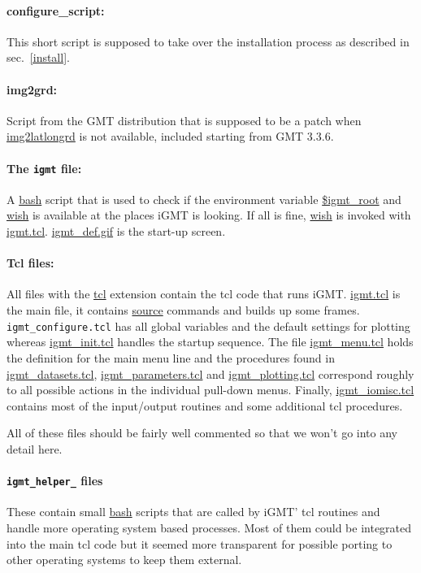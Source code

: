 \documentclass[11pt]{article}
\begin{document}
\paragraph{configure\_script:} This short script is supposed to take over the 
installation process as described in sec.~\ref{install}.

\paragraph{img2grd:} Script from the GMT distribution that is supposed to be a patch when 
\url{img2latlongrd} is not available, included starting from GMT
3.3.6.

\paragraph{The {\tt igmt} file:} A \url{bash} script that is used to
check if the environment variable \url{$igmt_root} and \url{wish} is
available at the places iGMT is looking. If all is fine, \url{wish}
is invoked with \url{igmt.tcl}. \url{igmt_def.gif} is the start-up
screen. 

\paragraph{Tcl files:} All files with the \url{tcl} extension contain
the tcl code that runs iGMT. \url{igmt.tcl} is the main file, it
contains \url{source} commands and builds up some frames. {\tt
  igmt\_configure.tcl} has all global variables and the default
settings for plotting whereas \url{igmt_init.tcl} handles the startup
sequence. The file \url{igmt_menu.tcl} holds the definition for the
main menu line and the procedures found in \url{igmt_datasets.tcl},
\url{igmt_parameters.tcl} and \url{igmt_plotting.tcl} correspond
roughly to all possible actions in the individual pull-down
menus. Finally, \url{igmt_iomisc.tcl} contains most of the input/output 
routines and some additional tcl procedures. 

All of these files should be fairly well commented so that we won't go
into any detail here. 

\paragraph{{\tt igmt\_helper\_} files} These contain small \url{bash}
scripts that are called by iGMT' tcl routines and handle more
operating system based processes. Most of them could be integrated
into the main tcl code but it seemed more transparent for possible
porting to other operating systems to keep them external. 
\end{document}
